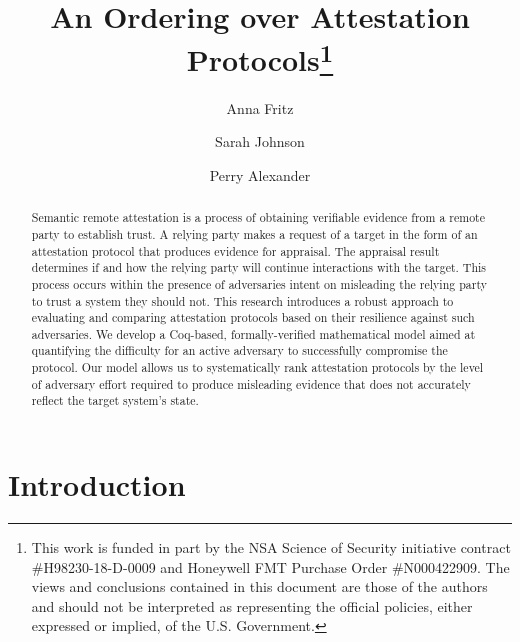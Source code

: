\documentclass[runningheads]{llncs}
\theoremstyle{definition}
\begin{document}
%
\title{An Ordering over Attestation Protocols\thanks{This work is
    funded in part by the NSA Science of Security initiative contract
    \#H98230-18-D-0009 and Honeywell FMT Purchase Order
    \#N000422909. The views and conclusions contained in this document
    are those of the authors and should not be interpreted as
    representing the official policies, either expressed or implied,
    of the U.S. Government.}
}
%
%
\author{Anna Fritz \and
Sarah Johnson \and
Perry Alexander}
%
%
%
\maketitle              %
%
\begin{abstract}
Semantic remote attestation is a process of obtaining verifiable
evidence from a remote party to establish trust. A relying party makes
a request of a target in the form of an attestation protocol that
produces evidence for appraisal. The appraisal result determines if
and how the relying party will continue interactions with the
target. This process occurs within the presence of adversaries intent
on misleading the relying party to trust a system they should
not. This research introduces a robust approach to evaluating and
comparing attestation protocols based on their resilience against such
adversaries. We develop a Coq-based, formally-verified mathematical
model aimed at quantifying the difficulty for an active adversary to
successfully compromise the protocol. Our model allows us to
systematically rank attestation protocols by the level of adversary
effort required to produce misleading evidence that does not
accurately reflect the target system's state. 

\end{abstract}
%
%
%
\section{Introduction}
\end{document}
